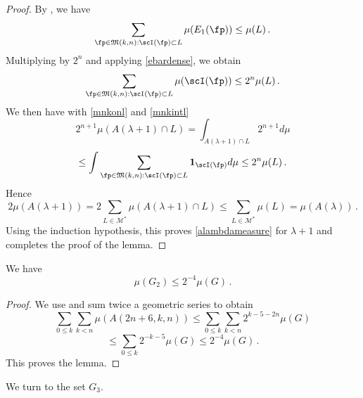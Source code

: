 \begin{proof}
By , we have
\begin{equation}
\sum_{\fp \in {\mathfrak{M}}(k,n):\scI(\fp) \subset L} \mu({E_1}(\fp)) \leq \mu(L)\, .
\end{equation}
Multiplying by $2^n$ and applying \eqref{ebardense}, we obtain
\begin{equation}\label{mnkintl}
    \sum_{\fp \in {\mathfrak{M}}(k,n):\scI(\fp) \subset L} \mu(\scI(\fp)) \leq 2^n \mu(L)\, .
\end{equation}
We then have with \eqref{mnkonl} and \eqref{mnkintl}
\begin{equation}
2^{n+1}\mu(A(\lambda+1)\cap L) =
 \int_{A(\lambda+1)\cap L} 2^{n+1} d\mu
\end{equation}
\begin{equation}
\le
    \int \sum_{\fp \in {\mathfrak{M}}(k,n):\scI(\fp) \subset L} \mathbf{1}_{\scI(\fp)} d\mu
\le 2^n \mu(L)\, .
\end{equation}
Hence
\begin{equation}
    2\mu(A(\lambda+1))=2\sum_{L\in \mathcal{M}^*}
\mu(A(\lambda+1)\cap L)\le
\sum_{L\in \mathcal{M}^*}\mu( L)= \mu(A(\lambda))\, .
\end{equation}
Using the induction hypothesis, this proves
\eqref{alambdameasure} for $\lambda+1$ and completes the proof of the lemma.
\end{proof}

\begin{lemma}
\label{second-exception}
\leanok
{}
We have
\begin{equation}
    \mu(G_2)\le 2^{-4} \mu(G)\, .
\end{equation}
\end{lemma}
\begin{proof}
\leanok
We use  and sum twice a geometric series
to obtain
\begin{equation}
    \sum_{0\le k}\sum_{k< n}
\mu(A(2n+6,k,n))\le \sum_{0\le k}\sum_{k< n} 2^{k-5-2n}\mu(G)
\end{equation}
\begin{equation}
   \le \sum_{0\le k} 2^{-k-5}\mu(G)\le 2^{-4}\mu(G)\, .
\end{equation}
This proves the lemma.
\end{proof}


We turn to the set $G_3$.

